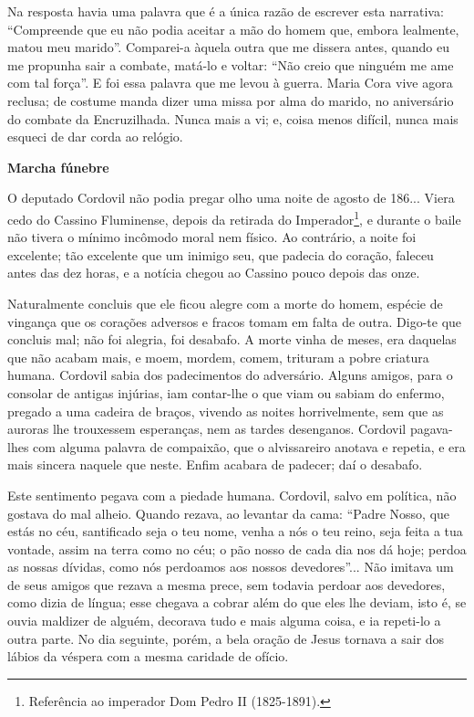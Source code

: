 Na resposta havia uma palavra que é a única razão de escrever esta
narrativa: ``Compreende que eu não podia aceitar a mão do homem que,
embora lealmente, matou meu marido''. Comparei-a àquela outra que me
dissera antes, quando eu me propunha sair a combate, matá-lo e voltar:
``Não creio que ninguém me ame com tal força''. E foi essa palavra que
me levou à guerra. Maria Cora vive agora reclusa; de costume manda dizer
uma missa por alma do marido, no aniversário do combate da Encruzilhada.
Nunca mais a vi; e, coisa menos difícil, nunca mais esqueci de dar corda
ao relógio.

\textbf{Marcha fúnebre}

O deputado Cordovil não podia pregar olho uma noite de agosto de 186...
Viera cedo do Cassino Fluminense, depois da retirada do
Imperador\footnote{Referência ao imperador Dom Pedro II (1825-1891).}, e
durante o baile não tivera o mínimo incômodo moral nem físico. Ao
contrário, a noite foi excelente; tão excelente que um inimigo seu, que
padecia do coração, faleceu antes das dez horas, e a notícia chegou ao
Cassino pouco depois das onze.

Naturalmente concluis que ele ficou alegre com a morte do homem, espécie
de vingança que os corações adversos e fracos tomam em falta de outra.
Digo-te que concluis mal; não foi alegria, foi desabafo. A morte vinha
de meses, era daquelas que não acabam mais, e moem, mordem, comem,
trituram a pobre criatura humana. Cordovil sabia dos padecimentos do
adversário. Alguns amigos, para o consolar de antigas injúrias, iam
contar-lhe o que viam ou sabiam do enfermo, pregado a uma cadeira de
braços, vivendo as noites horrivelmente, sem que as auroras lhe
trouxessem esperanças, nem as tardes desenganos. Cordovil pagava-lhes
com alguma palavra de compaixão, que o alvissareiro anotava e repetia, e
era mais sincera naquele que neste. Enfim acabara de padecer; daí o
desabafo.

Este sentimento pegava com a piedade humana. Cordovil, salvo em
política, não gostava do mal alheio. Quando rezava, ao levantar da cama:
``Padre Nosso, que estás no céu, santificado seja o teu nome, venha a
nós o teu reino, seja feita a tua vontade, assim na terra como no céu; o
pão nosso de cada dia nos dá hoje; perdoa as nossas dívidas, como nós
perdoamos aos nossos devedores''... Não imitava um de seus amigos que
rezava a mesma prece, sem todavia perdoar aos devedores, como dizia de
língua; esse chegava a cobrar além do que eles lhe deviam, isto é, se
ouvia maldizer de alguém, decorava tudo e mais alguma coisa, e ia
repeti-lo a outra parte. No dia seguinte, porém, a bela oração de Jesus
tornava a sair dos lábios da véspera com a mesma caridade de ofício.

